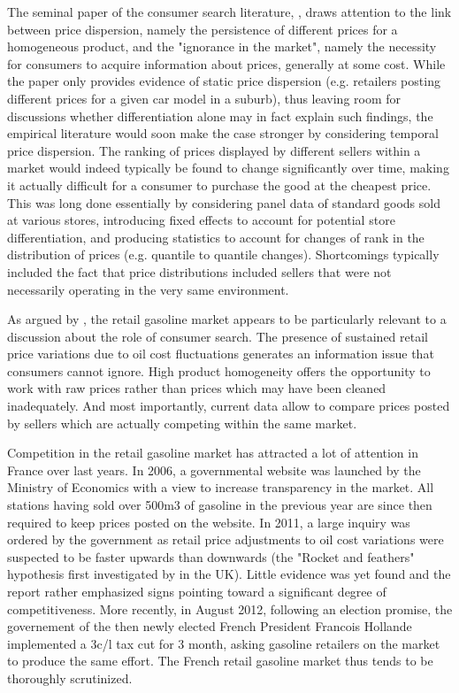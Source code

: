 \documentclass[11pt]{article}
\begin{document}
The seminal paper of the consumer search literature, \cite{STI61}, draws attention to the link between price dispersion, namely the persistence of different prices for a homogeneous product, and the "ignorance in the market", namely the necessity for consumers to acquire information about prices, generally at some cost. While the paper only provides evidence of static price dispersion (e.g. retailers posting different prices for a given car model in a suburb), thus leaving room for discussions whether differentiation alone may in fact explain such findings, the empirical literature would soon make the case stronger by considering temporal price dispersion. The ranking of prices displayed by different sellers within a market would indeed typically be found to change significantly over time, making it actually difficult for a consumer to purchase the good at the cheapest price. This was long done essentially by considering panel data of standard goods sold at various stores, introducing fixed effects to account for potential store differentiation, and producing statistics to account for changes of rank in the distribution of prices (e.g. quantile to quantile changes). Shortcomings typically included the fact that price distributions included sellers that were not necessarily operating in the very same environment.

As argued by \cite{TAP11}, the retail gasoline market appears to be particularly relevant to a discussion about the role of consumer search. The presence of sustained retail price variations due to oil cost fluctuations generates an information issue that consumers cannot ignore. High product homogeneity offers the opportunity to work with raw prices rather than prices which may have been cleaned inadequately. And most importantly, current data allow to compare prices posted by sellers which are actually competing within the same market.

Competition in the retail gasoline market has attracted a lot of attention in France over last years. In 2006, a governmental website was launched by the Ministry of Economics with a view to increase transparency in the market. All stations having sold over 500m3 of gasoline in the previous year are since then required to keep prices posted on the website. In 2011, a large inquiry was ordered by the government as retail price adjustments to oil cost variations were suspected to be faster upwards than downwards (the "Rocket and feathers" hypothesis first investigated by \cite{BAC91} in the UK). Little evidence was yet found and the report rather emphasized signs pointing toward a significant degree of competitiveness. More recently, in August 2012, following an election promise, the governement of the then newly elected French President Francois Hollande implemented a 3c/l tax cut for 3 month, asking gasoline retailers on the market to produce the same effort. The French retail gasoline market thus tends to be thoroughly scrutinized.
\end{document}
